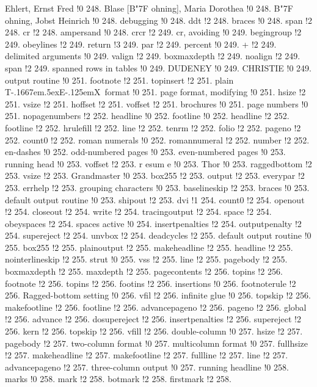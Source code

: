 Ehlert, Ernst Fred !0 248.
Blase [B{\accent "7F o}hning], Maria Dorothea !0 248.
B{\accent "7F o}hning, Jobst Heinrich !0 248.
debugging !0 248.
ddt !2 248.
braces !0 248.
span !2 248.
cr !2 248.
ampersand !0 248.
crcr !2 249.
cr, avoiding !0 249.
begingroup !2 249.
obeylines !2 249.
return !3 249.
par !2 249.
percent !0 249.
+ !2 249.
delimited arguments !0 249.
valign !2 249.
boxmaxdepth !2 249.
noalign !2 249.
span !2 249.
spanned rows in tables !0 249.
DUDENEY !0 249.
CHRISTIE !0 249.
output routine !0 251.
footnote !2 251.
topinsert !2 251.
plain T\kern -.1667em\lower .5ex\hbox {E}\kern -.125emX\ format !0 251.
page format, modifying !0 251.
hsize !2 251.
vsize !2 251.
hoffset !2 251.
voffset !2 251.
brochures !0 251.
page numbers !0 251.
nopagenumbers !2 252.
headline !0 252.
footline !0 252.
headline !2 252.
footline !2 252.
hrulefill !2 252.
line !2 252.
tenrm !2 252.
folio !2 252.
pageno !2 252.
count0 !2 252.
roman numerals !0 252.
romannumeral !2 252.
number !2 252.
en-dashes !0 252.
odd-numbered pages !0 253.
even-numbered pages !0 253.
running head !0 253.
voffset !2 253.
r{ e}sum{ e} !0 253.
Thor !0 253.
raggedbottom !2 253.
vsize !2 253.
Grandmaster !0 253.
box255 !2 253.
output !2 253.
everypar !2 253.
errhelp !2 253.
grouping characters !0 253.
baselineskip !2 253.
braces !0 253.
default output routine !0 253.
shipout !2 253.
dvi !1 254.
count0 !2 254.
openout !2 254.
closeout !2 254.
write !2 254.
tracingoutput !2 254.
space !2 254.
obeyspaces !2 254.
spaces active !0 254.
insertpenalties !2 254.
outputpenalty !2 254.
supereject !2 254.
unvbox !2 254.
deadcycles !2 255.
default output routine !0 255.
box255 !2 255.
plainoutput !2 255.
makeheadline !2 255.
headline !2 255.
nointerlineskip !2 255.
strut !0 255.
vss !2 255.
line !2 255.
pagebody !2 255.
boxmaxdepth !2 255.
maxdepth !2 255.
pagecontents !2 256.
topins !2 256.
footnote !2 256.
topins !2 256.
footins !2 256.
insertions !0 256.
footnoterule !2 256.
Ragged-bottom setting !0 256.
vfil !2 256.
infinite glue !0 256.
topskip !2 256.
makefootline !2 256.
footline !2 256.
advancepageno !2 256.
pageno !2 256.
global !2 256.
advance !2 256.
dosupereject !2 256.
insertpenalties !2 256.
supereject !2 256.
kern !2 256.
topskip !2 256.
vfill !2 256.
double-column !0 257.
hsize !2 257.
pagebody !2 257.
two-column format !0 257.
multicolumn format !0 257.
fullhsize !2 257.
makeheadline !2 257.
makefootline !2 257.
fullline !2 257.
line !2 257.
advancepageno !2 257.
three-column output !0 257.
running headline !0 258.
marks !0 258.
mark !2 258.
botmark !2 258.
firstmark !2 258.

